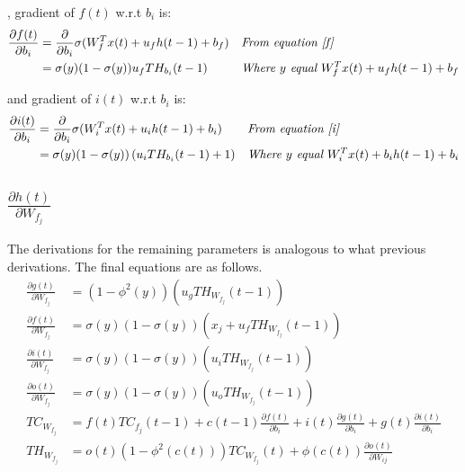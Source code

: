 \documentclass[twoside,11pt]{article}
\begin{document}
, gradient of $f(t)$  w.r.t $b_i$ is:
\begin{align*}
\frac{\partial f(t)}{\partial b_i} &=  \frac{\partial}{\partial b_i} \sigma(W_{f}^T x(t) + u_{f} h(t-1) + b_f) && \textit{From equation \ref{f}} \\
&= \sigma(y)(1-\sigma(y))u_f TH_{b_i}(t-1) && \textit{Where $y$ equal $W_{f}^T x(t) + u_{f} h(t-1) + b_f$} \\
\end{align*}

and gradient of $i(t)$  w.r.t $b_i$ is:
\begin{align*}
\frac{\partial i(t)}{\partial b_i} &=  \frac{\partial}{\partial b_i} \sigma(W_{i}^T x(t) + u_i h(t-1) + b_i) && \textit{From equation \ref{i}} \\
&= \sigma(y)(1-\sigma(y)) \left (u_i TH_{b_i}(t-1) + 1 \right )&& \textit{Where $y$ equal $W_{i}^T x(t) + b_i h(t-1) + b_i$} \\
\end{align*}


\subsection{$\frac{\partial h(t)}{\partial W_{f_j}}$}
The derivations for the remaining parameters is analogous to what previous derivations. The final equations are as follows.
\begin{equation}
\begin{aligned}
\frac{\partial g(t)}{\partial W_{f_j}} &=  (1-\phi^2(y))(u_g TH_{W_{f_j}}(t-1))  \\
\frac{\partial f(t)}{\partial W_{f_j}} &=  \sigma(y)(1-\sigma(y))( x_j + u_f TH_{W_{f_j}}(t-1)) \\
\frac{\partial i(t)}{\partial W_{f_j}}  &= \sigma(y)(1-\sigma(y))( u_i TH_{W_{f_j}}(t-1))  \\
\frac{\partial o(t)}{\partial W_{f_j}} &=  \sigma(y)(1-\sigma(y))( u_o TH_{W_{f_j}}(t-1))  \\
TC_{W_{f_j}}&= f(t) TC_{f_j}(t-1) + c(t-1)\frac{\partial f(t)}{ \partial b_i} + i(t)\frac{\partial g(t) }{\partial b_i}  + g(t)\frac{\partial i(t) }{\partial b_i}  \\
TH_{W_{f_j}}&= o(t) (1-\phi^{2}(c(t))) TC_{W_{f_j}}(t)  + \phi(c(t)) \frac{\partial o(t)}{\partial W_{ij}}  
\end{aligned}
\end{equation}
\end{document}
